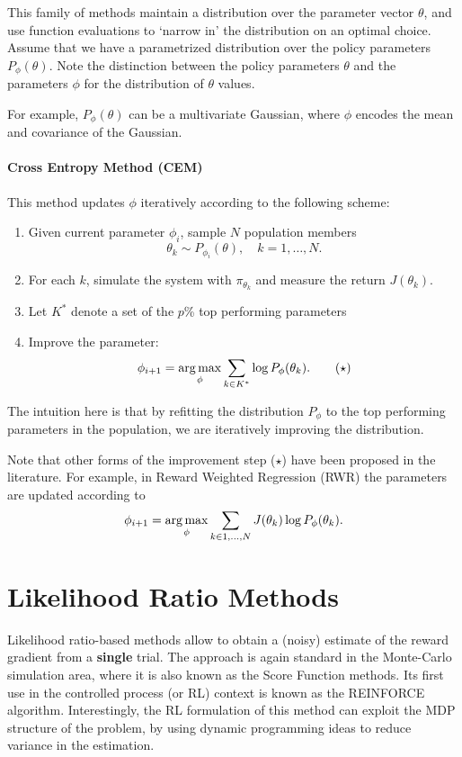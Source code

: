 This family of methods maintain a distribution over the parameter vector $\theta$, and use function evaluations to `narrow in' the distribution on an optimal choice. Assume that we have a parametrized distribution over the policy parameters $P_\phi(\theta)$. Note the distinction between the policy parameters $\theta$ and the parameters $\phi$ for the distribution of $\theta$ values.

For example, $P_\phi(\theta)$ can be a multivariate Gaussian, where $\phi$ encodes the mean and covariance of the Gaussian. 

\paragraph{Cross Entropy Method (CEM)}
This method updates $\phi$ iteratively according to the following scheme:
\begin{enumerate}
    \item Given current parameter $\phi_i$, sample $N$ population members
    $$
    \theta_k \sim P_{\phi_i}(\theta), \quad k=1,\dots,N.
    $$
    \item For each $k$, simulate the system with ${\pi_{\theta_k} }$ and measure the return $J(\theta_k)$.
    \item Let $K^*$ denote a set of the $p$\% top performing parameters
    \item Improve the parameter: 
    \begin{equation*}
    \phi_{i+1} = \argmax_\phi \sum_{k \in K^*} \log P_{\phi}(\theta_k). 
    \tag{$\star$}
    \end{equation*}
\end{enumerate}
The intuition here is that by refitting the distribution $P_\phi$ to the top performing parameters in the population, we are iteratively improving the distribution.

Note that other forms of the improvement step ($\star$) have been proposed in the literature. For example, in Reward Weighted Regression (RWR) the parameters are updated according to $$\phi_{i+1} = \argmax_\phi \sum_{k \in 1,\dots,N} J(\theta_k)\log P_{\phi}(\theta_k).$$

\section{Likelihood Ratio Methods}
Likelihood ratio-based methods allow to obtain a (noisy) estimate of the reward gradient from a \textbf{single} trial. The approach is again standard in the Monte-Carlo simulation area, where it is also known as the Score Function methods. Its first use in the controlled process (or RL) context is known as the REINFORCE algorithm. Interestingly, the RL formulation of this method can exploit the MDP structure of the problem, by using dynamic programming ideas to reduce variance in the estimation. 


